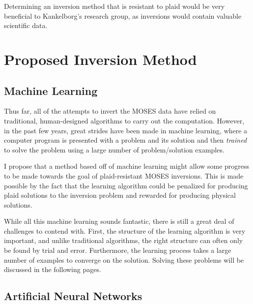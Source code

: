 \documentclass[twoside]{article}
\begin{document}
\begin{multicols}{2}
Determining an inversion method that is resistant to plaid would be very beneficial to Kankelborg's research group, as inversions would contain valuable scientific data.

\section{Proposed Inversion Method}
\subsection{Machine Learning}
Thus far, all of the attempts to invert the MOSES data have relied on traditional, human-designed algorithms to carry out the computation. However, in the past few years, great strides have been made in machine learning, where a computer program is presented with a problem and its solution and then \textit{trained} to solve the problem using a large number of  problem/solution examples. \par I propose that a method based off of machine learning might allow some progress to be made towards the goal of plaid-resistant MOSES inversions. This is made possible by the fact that the learning algorithm could be penalized for producing plaid solutions to the inversion problem and rewarded for producing physical solutions.  \par While all this machine learning sounds fantastic, there is still a great deal of challenges to contend with. First, the structure of the learning algorithm is very important, and unlike traditional algorithms, the right structure can often only be found by trial and error. Furthermore, the learning process takes a large number of examples to converge on the solution. Solving these problems will be discussed in the following pages.

\subsection{Artificial Neural Networks}


\end{multicols}
\end{document}

